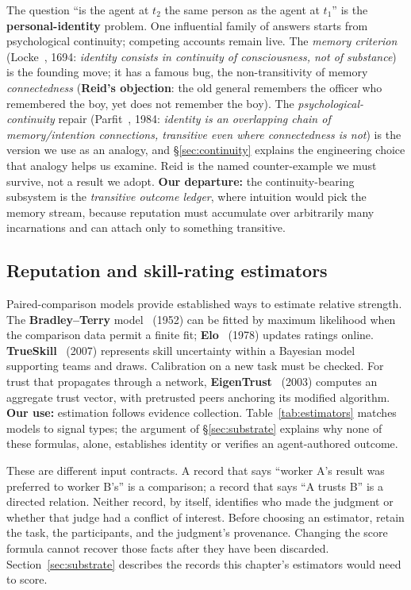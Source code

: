 \documentclass[11pt,a4paper]{article}
\theoremstyle{definition}
\begin{document}
The question ``is the agent at $t_2$ the same person as the agent at $t_1$'' is the
\textbf{personal-identity} problem. One influential family of answers starts
from psychological continuity; competing accounts remain live. The
\emph{memory criterion} (Locke~, 1694: \emph{identity consists
in continuity of consciousness, not of substance}) is the founding move; it has a
famous bug, the non-transitivity of memory \emph{connectedness} (\textbf{Reid's
objection}: the old general remembers the officer who remembered the boy, yet does
not remember the boy). The \emph{psychological-continuity} repair
(Parfit~, 1984: \emph{identity is an overlapping chain of
memory/intention connections, transitive even where connectedness is not}) is the
version we use as an analogy, and \S\ref{sec:continuity} explains the
engineering choice that analogy helps us examine. Reid is the named counter-example we must survive, not a result
we adopt. \textbf{Our departure:} the continuity-bearing subsystem is the
\emph{transitive outcome ledger}, where intuition would pick the memory stream,
because reputation must accumulate over arbitrarily many incarnations and can
attach only to something transitive.

\subsection{Reputation and skill-rating estimators}

Paired-comparison models provide established ways to estimate relative
strength. The \textbf{Bradley--Terry} model~ (1952) can
be fitted by maximum likelihood when the comparison data permit a finite fit;
\textbf{Elo}~ (1978) updates ratings online.
\textbf{TrueSkill}~ (2007) represents skill uncertainty
within a Bayesian model supporting teams and draws. Calibration on a new task
must be checked. For trust that propagates through a network,
\textbf{EigenTrust}~ (2003) computes an aggregate
trust vector, with pretrusted peers anchoring its modified algorithm.
\textbf{Our use:} estimation follows evidence collection. Table~\ref{tab:estimators}
matches models to signal types; the argument of \S\ref{sec:substrate}
explains why none of these formulas, alone, establishes identity or verifies an
agent-authored outcome.

These are different input contracts. A record that says ``worker A's result
was preferred to worker B's'' is a comparison; a record that says ``A trusts
B'' is a directed relation. Neither record, by itself, identifies who made
the judgment or whether that judge had a conflict of interest. Before choosing
an estimator, retain the task, the participants, and the judgment's provenance.
Changing the score formula cannot recover those facts after they have been
discarded. Section~\ref{sec:substrate} describes the records this chapter's
estimators would need to score.
\end{document}
